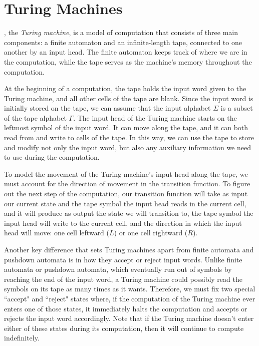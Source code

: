 \section{Turing Machines}\label{sec:turingmachines}

, the \emph{Turing machine}, is a model of computation that consists of three main components: a finite automaton and an infinite-length tape, connected to one another by an input head. The finite automaton keeps track of where we are in the computation, while the tape serves as the machine's memory throughout the computation.

At the beginning of a computation, the tape holds the input word given to the Turing machine, and all other cells of the tape are blank. Since the input word is initially stored on the tape, we can assume that the input alphabet $\Sigma$ is a subset of the tape alphabet $\Gamma$. The input head of the Turing machine starts on the leftmost symbol of the input word. It can move along the tape, and it can both read from and write to cells of the tape. In this way, we can use the tape to store and modify not only the input word, but also any auxiliary information we need to use during the computation.

To model the movement of the Turing machine's input head along the tape, we must account for the direction of movement in the transition function. To figure out the next step of the computation, our transition function will take as input our current state and the tape symbol the input head reads in the current cell, and it will produce as output the state we will transition to, the tape symbol the input head will write to the current cell, and the direction in which the input head will move: one cell leftward ($L$) or one cell rightward ($R$).

Another key difference that sets Turing machines apart from finite automata and pushdown automata is in how they accept or reject input words. Unlike finite automata or pushdown automata, which eventually run out of symbols by reaching the end of the input word, a Turing machine could possibly read the symbols on its tape as many times as it wants. Therefore, we must fix two special ``accept" and ``reject" states where, if the computation of the Turing machine ever enters one of those states, it immediately halts the computation and accepts or rejects the input word accordingly. Note that if the Turing machine doesn't enter either of these states during its computation, then it will continue to compute indefinitely.

